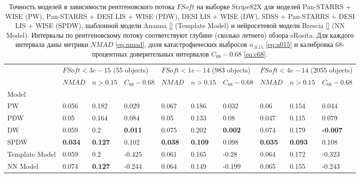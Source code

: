 \documentclass[fleqn,usenatbib]{mnras}
\begin{document}
\begin{table}
	\begin{tabular}{llllllllll}
            \hline
            {} & \multicolumn{3}{l}{$FSoft < 3e-15$ (55 objects)} & \multicolumn{3}{l}{$FSoft < 1e-14$ (983 objects)} & \multicolumn{3}{l}{$FSoft < 4e-14$ (2055 objects)} \\
            {} &                       $NMAD$ &        $n>0.15$ & $C_{68} - 0.68$ &                        $NMAD$ &        $n>0.15$ & $C_{68} - 0.68$ &                         $NMAD$ &        $n>0.15$ &  $C_{68} - 0.68$ \\
            Model          &                              &                 &                 &                               &                 &                 &                                &                 &                  \\
            \hline
            PW             &                        0.056 &           0.182 &           0.029 &                         0.067 &           0.186 &           0.032 &                           0.06 &           0.154 &            0.044 \\
            PDW            &                         0.05 &           0.164 &           0.084 &                          0.05 &           0.133 &            0.08 &                          0.047 &           0.115 &            0.079 \\
            DW             &                        0.059 &             0.2 &  \textbf{0.011} &                         0.075 &           0.202 &  \textbf{0.002} &                          0.074 &           0.179 &  \textbf{-0.007} \\
            SPDW           &               \textbf{0.034} &  \textbf{0.127} &           0.102 &                \textbf{0.038} &  \textbf{0.109} &           0.098 &                 \textbf{0.035} &  \textbf{0.093} &            0.108 \\
            Template Model &                        0.059 &             0.2 &          -0.425 &                         0.061 &           0.165 &           -0.28 &                          0.064 &           0.172 &           -0.323 \\
            NN Model       &                        0.074 &  \textbf{0.127} &          -0.244 &                         0.064 &           0.149 &          -0.199 &                          0.065 &           0.155 &           -0.243 \\
            \hline
            \end{tabular}
            \caption{Точность моделей в зависимости рентгеновского потока $FSoft$ на выборке Stripe82X для моделей Pan-STARRS + WISE (PW), Pan-STARRS + DESI LIS + WISE (PDW), DESI LIS + WISE (DW), SDSS + Pan-STARRS + DESI LIS + WISE (SPDW), шаблонной модели Ananna \ref{} (Template Model) и нейросетевой модели Brescia \ref{} (NN Model). Интервалы по рентгеновскому потоку соответствуют глубине (сколько летнего) обзора eRosita. Для каждого интервала даны метрики $NMAD$ \eqref{eq:nmad}, доля катастрофических выбросов $n_{.0.15}$ \eqref{eq:n015} и калибровка 68-процентных доверительных интервалов $C_{68} - 0.68$ \eqref{eq:c68}.}
\end{table}
\end{document}
